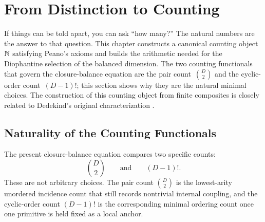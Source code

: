 \section{From Distinction to Counting}
\label{sec:counting}

If things can be told apart, you can ask ``how many?'' The natural numbers are
the answer to that question. This chapter constructs a canonical counting
object~$\mathbb{N}$ satisfying Peano's axioms and builds the arithmetic needed for
the Diophantine selection of the balanced dimension.
The two counting functionals that govern the closure-balance equation are the
pair count~$\binom{D}{2}$ and the cyclic-order count~$(D{-}1)!$; this section
shows why they are the natural minimal choices. The construction of this
counting object from finite composites is closely related to Dedekind's
original characterization \cite{Dedekind1888}.

\subsection{Naturality of the Counting Functionals}
\label{subsec:counting-functional-classification}

The present closure-balance equation compares two specific counts:
\[
\binom{D}{2}
\qquad\text{and}\qquad
(D-1)!.
\]
These are not arbitrary choices. The pair count \(\binom{D}{2}\) is the
lowest-arity unordered incidence count that still records nontrivial internal
coupling, and the cyclic-order count \((D-1)!\) is the corresponding minimal
ordering count once one primitive is held fixed as a local anchor.

